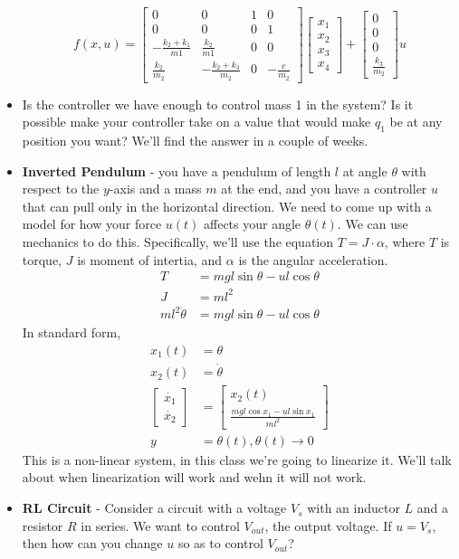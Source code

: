 \documentclass[12pt]{article}
\theoremstyle{definition}
\begin{document}
\begin{itemize}
    $$ f(x, u) = \begin{bmatrix} 0 & 0 & 1 & 0 \\ 0 & 0 & 0 & 1 \\ -\frac{k_2 + k_1}{m1} & \frac{k_2}{m1} & 0 & 0 \\ \frac{k_2}{m_2} & -\frac{k_2 + k_3}{m_2} & 0 & -\frac{c}{m_2} \end{bmatrix}\begin{bmatrix} x_1 \\ x_2 \\ x_3 \\ x_4 \end{bmatrix} + \begin{bmatrix}0 \\ 0 \\ 0 \\ \frac{k_3}{m_2} \end{bmatrix} u$$
    \item Is the controller we have enough to control mass 1 in the system? Is it possible make your controller take on a value that would make $q_1$ be at any position you want? We'll find the answer in a couple of weeks.
    \item \textbf{Inverted Pendulum} - you have a pendulum of length $l$ at angle $\theta$ with respect to the $y$-axis and a mass $m$ at the end, and you have a controller $u$ that can pull only in the horizontal direction. We need to come up with a model for how your force $u(t)$ affects your angle $\theta(t)$. We can use mechanics to do this. Specifically, we'll use the equation $T = J \cdot \alpha$, where $T$ is torque, $J$ is moment of intertia, and $\alpha$ is the angular acceleration.
    \begin{align*}
        T &= mgl\sin \theta - u l \cos \theta \\
        J &= ml^2 \\
        ml^2 \ddot{\theta} &= mgl\sin \theta - ul \cos \theta
    \end{align*}
    In standard form,
    \begin{align*}
        x_1(t) &= \theta \\
        x_2(t) &= \dot{\theta} \\
        \begin{bmatrix} \dot{x_1} \\ \dot{x_2} \end{bmatrix} &= \begin{bmatrix} x_2(t) \\ \frac{mgl\cos x_1 - ul \sin x_1 }{ml^2}\end{bmatrix} \\
        y &= \theta(t), \theta(t) \rightarrow 0
    \end{align*}
    This is a non-linear system, in this class we're going to linearize it. We'll talk about when linearization will work and wehn it will not work.
    \item \textbf{RL Circuit}  - Consider a circuit with a voltage $V_s$ with an inductor $L$  and a resistor $R$ in series. We want to control $V_{out}$, the output voltage. If $u = V_s$, then how can you change $u$ so as to control $V_{out}$?
    

\end{itemize}
\end{document}
